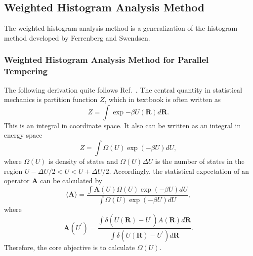 \subsection{Weighted Histogram Analysis Method\label{Sec:FEM:WHAM}}
The weighted histogram analysis method is a generalization of the histogram method developed by Ferrenberg and Swendsen.\cite{FerrenbergPRL1989}
\subsubsection{Weighted Histogram Analysis Method for Parallel Tempering\label{Sec:FEM:WHAM_REMD}}
The following derivation quite follows Ref.~\cite{ChoderaJCTC2007}.
The central quantity in statistical mechanics is partition function $Z$, which in textbook is often written as
\begin{equation}
Z=\int \exp{-\beta U(\mathbf{R})}d\mathbf{R}.
\end{equation}
This is an integral in coordinate space. It also can be written as an integral in energy space
\begin{equation}
Z=\int \Omega(U)\exp{(-\beta U)}dU,
\end{equation}
where $\Omega(U)$ is density of states and $\Omega(U)\Delta U$ is the number of states in the region $U-\Delta U/2<U<U+\Delta U/2$. Accordingly, the statistical expectation of an operator $\mathbf{A}$ can be calculated by
\begin{equation}
\langle \mathbf{A}\rangle=\frac {\int \mathbf{A}(U)\Omega(U)\exp{(-\beta U)}dU}{\int \Omega(U)\exp{(-\beta U)}dU},
\end{equation}
where
\begin{equation}
\mathbf{A}(U^\prime)=\frac{\int \delta (U(\mathbf{R})-U^\prime)A(\mathbf{R})d\mathbf{R}}{\int \delta (U(\mathbf{R})-U^\prime)d\mathbf{R}}.
\end{equation}
Therefore, the core objective is to calculate $\Omega(U)$.

